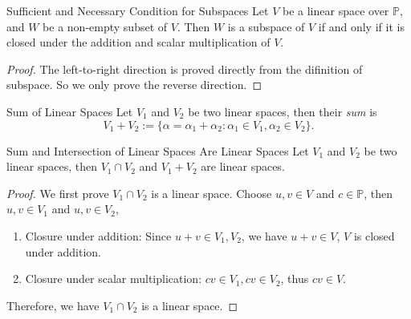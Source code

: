 \begin{proposition}{Sufficient and Necessary Condition for Subspaces}{}
  Let $V$ be a linear space over $\mathbb{P}$,
  and $W$ be a non-empty subset of $V$.
  Then $W$ is a subspace of $V$ if and only if
  it is closed under the addition and scalar multiplication of $V$.
\end{proposition}

\begin{proof}
  The left-to-right direction is proved directly from the difinition of subspace.
  So we only prove the reverse direction.
\end{proof}

\begin{definition}{Sum of Linear Spaces}{}
  Let $V_1$ and $V_2$ be two linear spaces, then their \emph{sum} is
  \begin{equation}
    V_1 + V_2 := \{\alpha = \alpha_1 + \alpha_2: \alpha_1 \in V_1, \alpha_2 \in V_2\}.
  \end{equation}
\end{definition}

\begin{proposition}{Sum and Intersection of Linear Spaces Are Linear Spaces}{}
  Let $V_1$ and $V_2$ be two linear spaces,
  then $V_1 \cap V_2$ and $V_1 + V_2$ are linear spaces.
\end{proposition}

\begin{proof}
  We first prove $V_1 \cap V_2$ is a linear space.
  Choose $u, v \in V$ and $c \in \mathbb{P}$, then $u, v \in V_1$ and $u, v \in V_2$,
  \begin{enumerate}
  \item Closure under addition: Since $u + v \in V_1, V_2$, we have $u + v \in
    V$, $V$ is closed under addition.
  \item Closure under scalar multiplication: $c v \in V_1, c v \in V_2$,
    thus $c v \in V$.
  \end{enumerate}
  Therefore, we have $V_1 \cap V_2$ is a linear space.
\end{proof}

